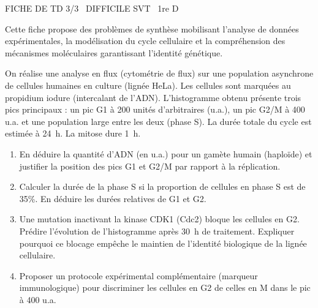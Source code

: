 \documentclass[11pt]{article}
\begin{document}
\begin{tcolorbox}[enhanced,colback=popink,colframe=popink,arc=10pt,boxrule=0pt,left=12pt,right=12pt,top=9pt,bottom=9pt]
{\color{white}\popxbold\small FICHE DE TD 3/3 \textbullet\ DIFFICILE \hfill SVT \textbullet\ 1re D\par}
\end{tcolorbox}
\vspace{4pt}
Cette fiche propose des problèmes de synthèse mobilisant l'analyse de données expérimentales, la modélisation du cycle cellulaire et la compréhension des mécanismes moléculaires garantissant l'identité génétique.

\begin{exercice}
On réalise une analyse en flux (cytométrie de flux) sur une population asynchrone de cellules humaines en culture (lignée HeLa). Les cellules sont marquées au propidium iodure (intercalant de l'ADN). L'histogramme obtenu présente trois pics principaux : un pic G1 à 200 unités d'arbitraires (u.a.), un pic G2/M à 400 u.a. et une population large entre les deux (phase S). La durée totale du cycle est estimée à \SI{24}{\hour}. La mitose dure \SI{1}{\hour}.
\begin{enumerate}
    \item En déduire la quantité d'ADN (en u.a.) pour un gamète humain (haploïde) et justifier la position des pics G1 et G2/M par rapport à la réplication.
    \item Calculer la durée de la phase S si la proportion de cellules en phase S est de 35\%. En déduire les durées relatives de G1 et G2.
    \item Une mutation inactivant la kinase CDK1 (Cdc2) bloque les cellules en G2. Prédire l'évolution de l'histogramme après \SI{30}{\hour} de traitement. Expliquer pourquoi ce blocage empêche le maintien de l'identité biologique de la lignée cellulaire.
    \item Proposer un protocole expérimental complémentaire (marqueur immunologique) pour discriminer les cellules en G2 de celles en M dans le pic à 400 u.a.
\end{enumerate}
\end{exercice}
\end{document}
